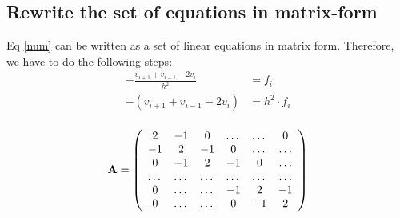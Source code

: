 \documentclass[10pt,a4paper]{article}
\begin{document}
%

\subsection{Rewrite the set of equations in matrix-form}
Eq \eqref{num} can be written as a set of linear equations in matrix form. Therefore, we have to do the following steps:
\begin{align}
	-\frac{v_{i+1}+v_{i-1}-2v_i}{h^2}&=f_i\nonumber\\
	-\left(v_{i+1}+v_{i-1}-2v_i\right)&=h^2\cdot f_i\\
\end{align}

\begin{equation}
{\bf A} = \left(\begin{array}{cccccc}
2& -1& 0 &\dots   & \dots &0 \\
-1 & 2 & -1 &0 &\dots &\dots \\
0&-1 &2 & -1 & 0 & \dots \\\dots
& \dots   & \dots &\dots   &\dots & \dots \\
0&\dots   &\dots  &-1 &2& -1 \\
0&\dots    &\dots  & 0  &-1 & 2 \\
\end{array} \right)
\end{equation}
\end{document}
